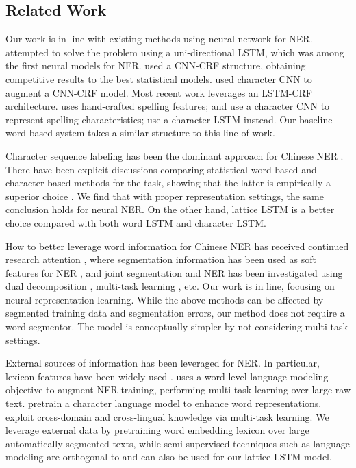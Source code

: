 \documentclass[11pt,a4paper]{article}
\begin{document}
\begin{CJK*}{UTF8}{gbsn}
\section{Related Work}
Our work is in line with existing methods using neural network for NER. \citet{hammerton2003named} attempted to solve the problem using a uni-directional LSTM, which was among the first neural models for NER. \citet{collobert2011natural} used a CNN-CRF structure, obtaining competitive results to the best statistical models. \citet{dos2015boosting} used character CNN to augment a CNN-CRF model. Most recent work leverages an LSTM-CRF architecture. \citet{huang2015bidirectional} uses hand-crafted spelling features; \citet{ma2016end} and \citet{chiu2015named} use a character CNN to represent spelling characteristics; \citet{lample2016neural} use a character LSTM instead. Our baseline word-based system takes a similar structure to this line of work. 

Character sequence labeling has been the dominant approach for Chinese NER \cite{chen2006chinesener,lu2016multi,dong2016character}. There have been explicit discussions comparing statistical word-based and character-based methods for the task, showing that the latter is empirically a superior choice \cite{he2008chinese,liu2010chinese,li2014comparison}. We find that with proper representation settings, the same conclusion holds for neural NER. On the other hand, lattice LSTM is a better choice compared with both word LSTM and character LSTM.


How to better leverage word information for Chinese NER has received continued research attention \cite{gao2005chinese}, where segmentation information has been used as soft features for NER \cite{zhao2008unsupervised,peng2015named,he2017f}, and joint segmentation and NER has been investigated using dual decomposition \cite{xu2014joint}, multi-task learning \cite{peng2016improving}, etc. Our work is in line, focusing on neural representation learning. While the above methods can be affected by segmented training data and segmentation errors, our method does not require a word segmentor. The model is conceptually simpler by not considering multi-task settings. 

External sources of information has been leveraged for NER. In particular, lexicon features have been widely used \cite{collobert2011natural,passos2014lexicon,huang2015bidirectional,luo2015joint}. \citet{rei2017semi} uses a word-level language modeling objective to augment NER training, performing multi-task learning over large raw text. \citet{peters2017semi} pretrain a character language model to enhance word representations. \citet{yang2017transfer} exploit cross-domain and cross-lingual knowledge via multi-task learning.  We leverage external data by pretraining word embedding lexicon over large automatically-segmented texts, while semi-supervised techniques such as language modeling are orthogonal to and can also be used for our lattice LSTM model.


\end{CJK*}
\end{document}
